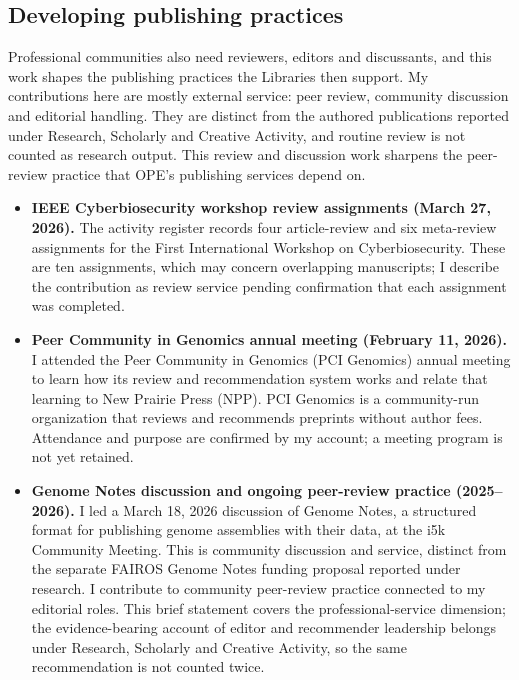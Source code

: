 \subsection{Developing publishing practices}
Professional communities also need reviewers, editors and discussants, and this work shapes the publishing practices the Libraries then support. My contributions here are mostly external service: peer review, community discussion and editorial handling. They are distinct from the authored publications reported under Research, Scholarly and Creative Activity, and routine review is not counted as research output. This review and discussion work sharpens the peer-review practice that OPE's publishing services depend on.

\begin{itemize}
\item \textbf{IEEE Cyberbiosecurity workshop review assignments (March 27, 2026).} The activity register records four article-review and six meta-review assignments for the First International Workshop on Cyberbiosecurity. These are ten assignments, which may concern overlapping manuscripts; I describe the contribution as review service pending confirmation that each assignment was completed.
\item \textbf{Peer Community in Genomics annual meeting (February 11, 2026).} I attended the Peer Community in Genomics (PCI Genomics) annual meeting to learn how its review and recommendation system works and relate that learning to New Prairie Press (NPP). PCI Genomics is a community-run organization that reviews and recommends preprints without author fees. Attendance and purpose are confirmed by my account; a meeting program is not yet retained.
\item \textbf{Genome Notes discussion and ongoing peer-review practice (2025--2026).} I led a March 18, 2026 discussion of Genome Notes, a structured format for publishing genome assemblies with their data, at the i5k Community Meeting. This is community discussion and service, distinct from the separate FAIROS Genome Notes funding proposal reported under research. I contribute to community peer-review practice connected to my editorial roles. This brief statement covers the professional-service dimension; the evidence-bearing account of editor and recommender leadership belongs under Research, Scholarly and Creative Activity, so the same recommendation is not counted twice.
\end{itemize}

